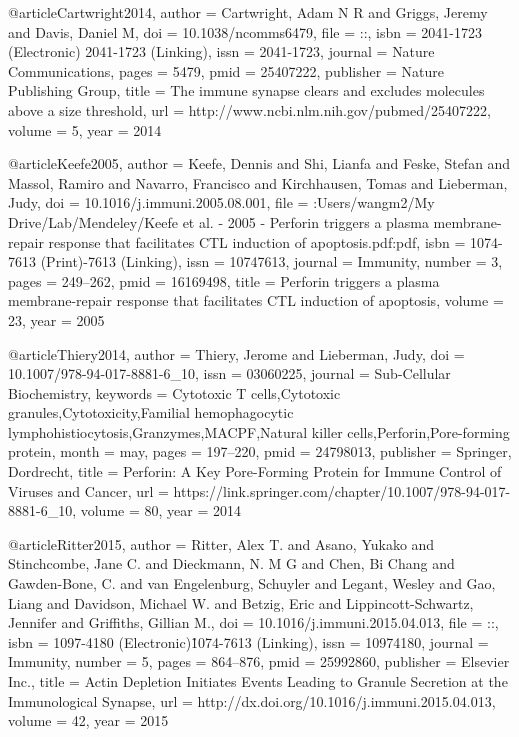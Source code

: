 @article{Cartwright2014,
author = {Cartwright, Adam N R and Griggs, Jeremy and Davis, Daniel M},
doi = {10.1038/ncomms6479},
file = {::},
isbn = {2041-1723 (Electronic) 2041-1723 (Linking)},
issn = {2041-1723},
journal = {Nature Communications},
pages = {5479},
pmid = {25407222},
publisher = {Nature Publishing Group},
title = {{The immune synapse clears and excludes molecules above a size threshold}},
url = {http://www.ncbi.nlm.nih.gov/pubmed/25407222},
volume = {5},
year = {2014}
}

@article{Keefe2005,
author = {Keefe, Dennis and Shi, Lianfa and Feske, Stefan and Massol, Ramiro and Navarro, Francisco and Kirchhausen, Tomas and Lieberman, Judy},
doi = {10.1016/j.immuni.2005.08.001},
file = {:Users/wangm2/My Drive/Lab/Mendeley/Keefe et al. - 2005 - Perforin triggers a plasma membrane-repair response that facilitates CTL induction of apoptosis.pdf:pdf},
isbn = {1074-7613 (Print)-7613 (Linking)},
issn = {10747613},
journal = {Immunity},
number = {3},
pages = {249--262},
pmid = {16169498},
title = {{Perforin triggers a plasma membrane-repair response that facilitates CTL induction of apoptosis}},
volume = {23},
year = {2005}
}

@article{Thiery2014,
author = {Thiery, Jerome and Lieberman, Judy},
doi = {10.1007/978-94-017-8881-6_10},
issn = {03060225},
journal = {Sub-Cellular Biochemistry},
keywords = {Cytotoxic T cells,Cytotoxic granules,Cytotoxicity,Familial hemophagocytic lymphohistiocytosis,Granzymes,MACPF,Natural killer cells,Perforin,Pore-forming protein},
month = {may},
pages = {197--220},
pmid = {24798013},
publisher = {Springer, Dordrecht},
title = {{Perforin: A Key Pore-Forming Protein for Immune Control of Viruses and Cancer}},
url = {https://link.springer.com/chapter/10.1007/978-94-017-8881-6_10},
volume = {80},
year = {2014}
}

@article{Ritter2015,
author = {Ritter, Alex T. and Asano, Yukako and Stinchcombe, Jane C. and Dieckmann, N. M G and Chen, Bi Chang and Gawden-Bone, C. and van Engelenburg, Schuyler and Legant, Wesley and Gao, Liang and Davidson, Michael W. and Betzig, Eric and Lippincott-Schwartz, Jennifer and Griffiths, Gillian M.},
doi = {10.1016/j.immuni.2015.04.013},
file = {::},
isbn = {1097-4180 (Electronic)\r1074-7613 (Linking)},
issn = {10974180},
journal = {Immunity},
number = {5},
pages = {864--876},
pmid = {25992860},
publisher = {Elsevier Inc.},
title = {{Actin Depletion Initiates Events Leading to Granule Secretion at the Immunological Synapse}},
url = {http://dx.doi.org/10.1016/j.immuni.2015.04.013},
volume = {42},
year = {2015}
}

